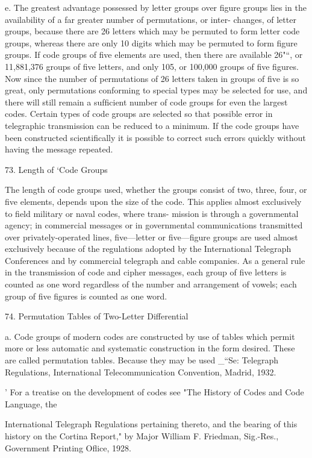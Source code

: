e. The greatest advantage possessed by letter groups over ﬁgure groups
lies in the availability of a far greater number of permutations, or inter-
changes, of letter groups, because there are 26 letters which may be
permuted to form letter code groups, whereas there are only 10 digits
which may be permuted to form ﬁgure groups. If code groups of ﬁve
elements are used, then there are available 26"“, or 11,881,376 groups of
ﬁve letters, and only 105, or 100,000 groups of ﬁve ﬁgures. Now since
the number of permutations of 26 letters taken in groups of ﬁve is so
great, only permutations conforming to special types may be selected for
use, and there will still remain a sufﬁcient number of code groups for
even the largest codes. Certain types of code groups are selected so that
possible error in telegraphic transmission can be reduced to a minimum.
If the code groups have been constructed scientiﬁcally it is possible to
correct such errors quickly without having the message repeated.

73. Length of ‘Code Groups

The length of code groups used, whether the groups consist of two,
three, four, or ﬁve elements, depends upon the size of the code. This
applies almost exclusively to ﬁeld military or naval codes, where trans-
mission is through a governmental agency; in commercial messages or
in governmental communications transmitted over privately-operated
lines, ﬁve—letter or ﬁve—ﬁgure groups are used almost exclusively because
of the regulations adopted by the International Telegraph Conferences
and by commercial telegraph and cable companies. As a general rule in
the transmission of code and cipher messages, each group of ﬁve letters
is counted as one word regardless of the number and arrangement of
vowels; each group of ﬁve ﬁgures is counted as one word.

74. Permutation Tables of Two-Letter Differential

a. Code groups of modern codes are constructed by use of tables which
permit more or less automatic and systematic construction in the form
desired. These are called permutation tables. Because they may be used
_“Se: Telegraph Regulations, International Telecommunication Convention, Madrid, 1932.

’ For a treatise on the development of codes see "The History of Codes and Code Language, the

International Telegraph Regulations pertaining thereto, and the bearing of this history on the
Cortina Report," by Major William F. Friedman, Sig.-Res., Government Printing Oﬂice, 1928.

